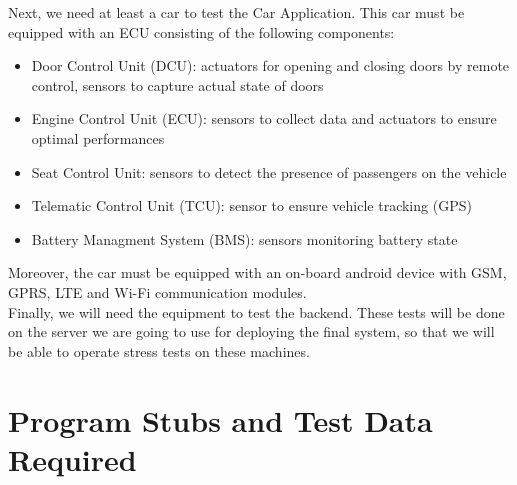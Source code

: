 \documentclass{article}
\begin{document}
Next, we need at least a car to test the Car Application. This car must be equipped with an ECU consisting of the following components:
\begin{itemize}[noitemsep]
\item Door Control Unit (DCU): actuators for opening and closing doors by remote control, sensors to capture actual state of doors
\item Engine Control Unit (ECU): sensors to collect data and actuators to ensure optimal performances
\item Seat Control Unit: sensors to detect the presence of passengers on the vehicle
\item Telematic Control Unit (TCU): sensor to ensure vehicle tracking (GPS)
\item Battery Managment System (BMS): sensors monitoring battery state
\end{itemize}
Moreover, the car must be equipped with an on-board android device with GSM, GPRS, LTE and Wi-Fi communication modules.
\\

Finally, we will need the equipment to test the backend. These tests will be done on the server we are going to use for deploying the final system, so that we will be able to operate stress tests on these machines.
\newpage
\section{Program Stubs and Test Data Required}
\end{document}
